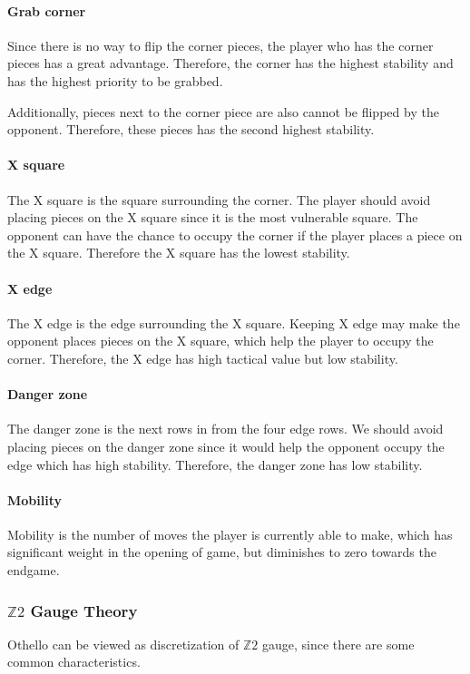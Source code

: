 \documentclass[aps,pra,reprint,amsmath,amssymb,floatfix]{revtex4-2}
\begin{document}
\paragraph{Grab corner}
Since there is no way to flip the corner pieces, the player who has the corner pieces has a great advantage. Therefore, the corner has the highest stability and has the highest priority to be grabbed.

Additionally, pieces next to the corner piece are also cannot be flipped by the opponent. Therefore, these pieces has the second highest stability.
\par
\paragraph{X square}
The X square is the square surrounding the corner. The player should avoid placing pieces on the X square since it is the most vulnerable square. The opponent can have the chance to occupy the corner if the player places a piece on the X square. Therefore the X square has the lowest stability.
\par
\paragraph{X edge}
The X edge is the edge surrounding the X square. Keeping X edge may make the opponent places pieces on the X square, which help the player to occupy the corner. Therefore, the X edge has high tactical value but low stability.
\par
\paragraph{Danger zone} 
The danger zone is the next rows in from the four edge rows. We should avoid placing pieces on the danger zone since it would help the opponent occupy the edge which has high stability. Therefore, the danger zone has low stability.
\par 
\paragraph{Mobility}
Mobility is the number of moves the player is currently able to make, which has significant weight in the opening of game, but diminishes to zero towards the endgame.
\par

\subsubsection{$\mathbb{Z}2$ Gauge Theory}
Othello can be viewed as discretization of $\mathbb{Z}2$ gauge, since there are some common characteristics. 
\end{document}
